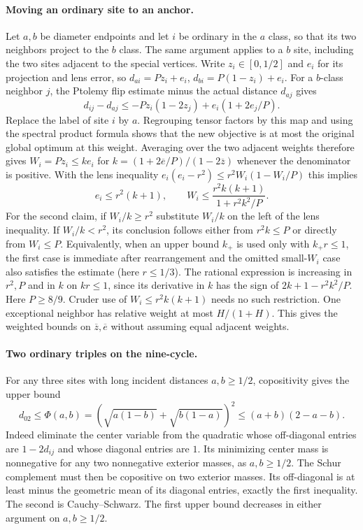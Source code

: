 \documentclass[11pt,a4paper]{article}
\theoremstyle{definition}
\begin{document}
\paragraph{Moving an ordinary site to an anchor.}
Let $a,b$ be diameter endpoints and let $i$ be ordinary in the $a$ class,
so that its two neighbors project to the $b$ class.  The same argument
applies to a $b$ site, including the two sites adjacent to the special
vertices.  Write $z_i\in[0,1/2]$ and $e_i$ for its projection and lens
error, so $d_{ai}=Pz_i+e_i$, $d_{bi}=P(1-z_i)+e_i$.  For a $b$-class
neighbor $j$, the Ptolemy flip estimate minus the actual distance $d_{aj}$
gives
\[
 d_{ij}-d_{aj}\le -Pz_i(1-2z_j)+e_i(1+2e_j/P).
\]
Replace the label of site $i$ by $a$.  Regrouping tensor factors by this
map and using the spectral product formula shows that the new objective is
at most the original global optimum at this weight.  Averaging over the
two adjacent weights therefore gives $W_i=Pz_i\le k e_i$ for
$k=(1+2\overline e/P)/(1-2\overline z)$ whenever the denominator is
positive.  With the lens inequality
$e_i(e_i-r^2)\le r^2 W_i(1-W_i/P)$ this implies
\[
 e_i\le r^2(k+1),\qquad
 W_i\le \frac{r^2 k(k+1)}{1+r^2 k^2/P}.
\]
For the second claim, if $W_i/k\ge r^2$ substitute $W_i/k$ on the left
of the lens inequality.  If $W_i/k<r^2$, its conclusion follows either
from $r^2k\le P$ or directly from $W_i\le P$.  Equivalently, when an
upper bound $k_+$ is used only with $k_+r\le1$, the first case is
immediate after rearrangement and the omitted small-$W_i$ case also
satisfies the estimate (here $r\le1/3$).  The rational expression is
increasing in $r^2,P$ and in $k$ on $k r\le1$, since its derivative in
$k$ has the sign of $2k+1-r^2k^2/P$.  Here $P\ge 8/9$.  Cruder use of
$W_i\le r^2 k(k+1)$ needs no such restriction.  One exceptional neighbor
has relative weight at most $H/(1+H)$. This gives the weighted bounds on
$\overline z,\overline e$ without assuming equal adjacent weights.

\paragraph{Two ordinary triples on the nine-cycle.}
For any three sites with long incident distances $a,b\ge1/2$, copositivity
gives the upper bound
\[
 d_{02}\le \Phi(a,b)=(\sqrt{a(1-b)}+\sqrt{b(1-a)})^2
 \le(a+b)(2-a-b).
\]
Indeed eliminate the center variable from the quadratic whose off-diagonal
entries are $1-2d_{ij}$ and whose diagonal entries are $1$.  Its minimizing
center mass is nonnegative for any two nonnegative exterior masses, as
$a,b\ge1/2$.  The Schur complement must then be copositive on two exterior
masses.  Its off-diagonal is at least minus the geometric mean of its
diagonal entries, exactly the first inequality.  The second is
Cauchy--Schwarz.  The first upper bound decreases in either argument on
$a,b\ge1/2$.
\end{document}
